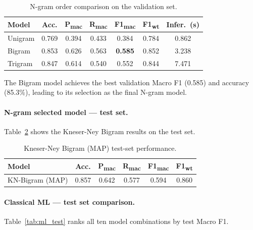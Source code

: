 \documentclass[11pt,a4paper]{article}
\begin{document}
\begin{table}[h!]
\centering
\caption{N-gram order comparison on the validation set.}
\label{tab:ngram_val}
\begin{tabular}{lcccccc}
\toprule
\textbf{Model} & \textbf{Acc.} &
  \textbf{P\textsubscript{mac}} & \textbf{R\textsubscript{mac}} &
  \textbf{F1\textsubscript{mac}} & \textbf{F1\textsubscript{wt}} &
  \textbf{Infer.\ (s)} \\
\midrule
Unigram & 0.769 & 0.394 & 0.433 & 0.384 & 0.784 & 0.862 \\
Bigram  & 0.853 & 0.626 & 0.563 & \textbf{0.585} & 0.852 & 3.238 \\
Trigram & 0.847 & 0.614 & 0.540 & 0.552 & 0.844 & 7.471 \\
\bottomrule
\end{tabular}
\end{table}

The Bigram model achieves the best validation Macro F1 (0.585) and
accuracy (85.3\%), leading to its selection as the final N-gram model.

\paragraph{N-gram selected model --- test set.}

Table~\ref{tab:ngram_test} shows the Kneser-Ney Bigram results on the test set.

\begin{table}[h!]
\centering
\caption{Kneser-Ney Bigram (MAP) test-set performance.}
\label{tab:ngram_test}
\begin{tabular}{lccccc}
\toprule
\textbf{Model} & \textbf{Acc.} &
  \textbf{P\textsubscript{mac}} & \textbf{R\textsubscript{mac}} &
  \textbf{F1\textsubscript{mac}} & \textbf{F1\textsubscript{wt}} \\
\midrule
KN-Bigram (MAP) & 0.857 & 0.642 & 0.577 & 0.594 & 0.860 \\
\bottomrule
\end{tabular}
\end{table}

\paragraph{Classical ML --- test set comparison.}

Table~\ref{tab:ml_test} ranks all ten model combinations by test Macro F1.
\end{document}
